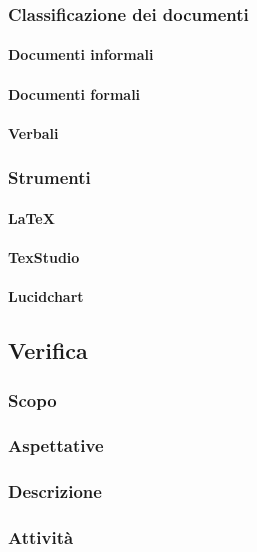 	\subsubsection{Classificazione dei documenti}
		\paragraph{Documenti informali}
		\paragraph{Documenti formali}
		\paragraph{Verbali}
	\subsubsection{Strumenti}
		\paragraph{\LaTeX}
		\paragraph{TexStudio}
		\paragraph{Lucidchart}
	
\subsection{Verifica}

	\subsubsection{Scopo}
	\subsubsection{Aspettative}
	\subsubsection{Descrizione}
	\subsubsection{Attività}
